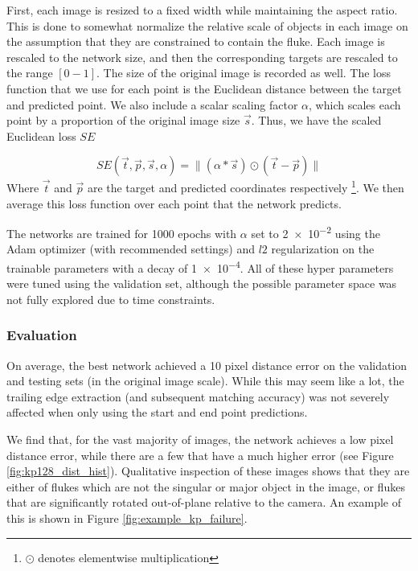 First, each image is resized to a fixed width while maintaining the aspect ratio.
This is done to somewhat normalize the relative scale of objects in each image on the assumption that they are constrained to contain the fluke.
Each image is rescaled to the network size, and then the corresponding targets are rescaled to the range $[0-1]$.
The size of the original image is recorded as well.
The loss function that we use for each point is the Euclidean distance between the target and predicted point.
We also include a scalar scaling factor $\alpha$, which scales each point by a proportion of the original image size $\vec{s}$.
Thus, we have the scaled Euclidean loss $SE$

\begin{equation} \label{eqn:se_loss}
SE(\vec{t}, \vec{p}, \vec{s}, \alpha) = \lVert (\alpha * \vec{s}) \odot (\vec{t} - \vec{p}) \rVert
\end{equation} 
Where $\vec{t}$ and $\vec{p}$ are the target and predicted coordinates respectively \footnote{$\odot$ denotes elementwise multiplication}.
We then average this loss function over each point that the network predicts.

The networks are trained for 1000 epochs with $\alpha$ set to \num{2e-2} using the Adam \cite{kingma2014adam} optimizer (with recommended settings) and $l2$ regularization on the trainable parameters with a decay of \num{1e-4}.
All of these hyper parameters were tuned using the validation set, although the possible parameter space was not fully explored due to time constraints.

\subsubsection{Evaluation} %


On average, the best network achieved a 10 pixel distance error on the validation and testing sets (in the original image scale).
While this may seem like a lot, the trailing edge extraction (and subsequent matching accuracy) was not severely affected when only using the start and end point predictions.

We find that, for the vast majority of images, the network achieves a low pixel distance error, while there are a few that have a much higher error (see Figure \ref{fig:kp128_dist_hist}).
Qualitative inspection of these images shows that they are either of flukes which are not the singular or major object in the image, or flukes that are significantly rotated out-of-plane relative to the camera.
An example of this is shown in Figure \ref{fig:example_kp_failure}.

